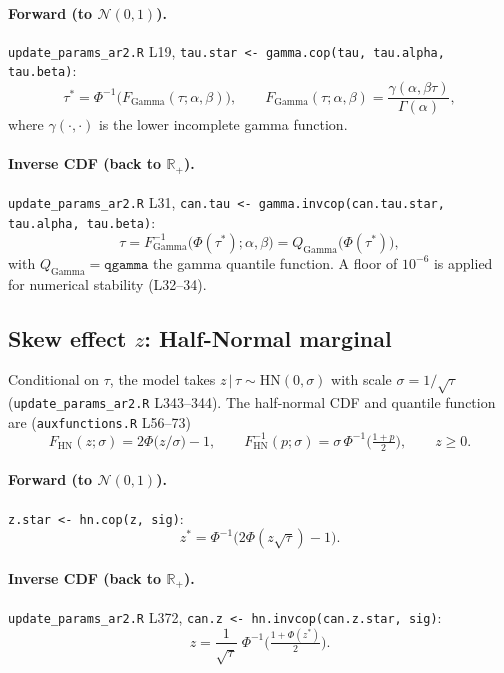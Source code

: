 \documentclass[11pt]{article}
\theoremstyle{definition}
\newcommand{\Rplus}{\mathbb{R}_{+}}
\newcommand{\Norm}{\mathcal{N}}
\newcommand{\Gam}{\mathrm{Gamma}}
\newcommand{\HN}{\mathrm{HN}}
\newcommand{\given}{\,\vert\,}
\newcommand{\Phinv}{\Phi^{-1}}
\newcommand{\code}[1]{\texttt{#1}}
\begin{document}
\paragraph{Forward (to $\Norm(0,1)$).}
\code{update\_params\_ar2.R} L19, \code{tau.star <- gamma.cop(tau, tau.alpha, tau.beta)}:
\begin{equation}
\tau^\ast = \Phinv\!\big(F_\Gam(\tau;\alpha,\beta)\big),
\qquad
F_\Gam(\tau;\alpha,\beta) = \frac{\gamma(\alpha,\beta\tau)}{\Gamma(\alpha)},
\end{equation}
where $\gamma(\cdot,\cdot)$ is the lower incomplete gamma function.

\paragraph{Inverse CDF (back to $\Rplus$).}
\code{update\_params\_ar2.R} L31, \code{can.tau <- gamma.invcop(can.tau.star, tau.alpha, tau.beta)}:
\begin{equation}
\tau = F_\Gam^{-1}\!\big(\Phi(\tau^\ast);\alpha,\beta\big)
     = Q_\Gam\!\big(\Phi(\tau^\ast)\big),
\end{equation}
with $Q_\Gam=\code{qgamma}$ the gamma quantile function. A floor of $10^{-6}$ is
applied for numerical stability (L32--34).

\subsection{Skew effect $z$: Half-Normal marginal}
Conditional on $\tau$, the model takes $z\given\tau\sim\HN(0,\sigma)$ with scale
$\sigma=1/\sqrt{\tau}$ (\code{update\_params\_ar2.R} L343--344). The half-normal CDF and
quantile function are (\code{auxfunctions.R} L56--73)
\begin{equation}
F_\HN(z;\sigma) = 2\Phi\!\big(z/\sigma\big) - 1,
\qquad
F_\HN^{-1}(p;\sigma) = \sigma\,\Phinv\!\Big(\tfrac{1+p}{2}\Big),
\qquad z \ge 0.
\end{equation}

\paragraph{Forward (to $\Norm(0,1)$).}
\code{z.star <- hn.cop(z, sig)}:
\begin{equation}
z^\ast = \Phinv\!\big(2\Phi(z\sqrt{\tau}) - 1\big).
\end{equation}

\paragraph{Inverse CDF (back to $\Rplus$).}
\code{update\_params\_ar2.R} L372, \code{can.z <- hn.invcop(can.z.star, sig)}:
\begin{equation}
z = \frac{1}{\sqrt{\tau}}\;\Phinv\!\Big(\tfrac{1+\Phi(z^\ast)}{2}\Big).
\end{equation}
\end{document}
